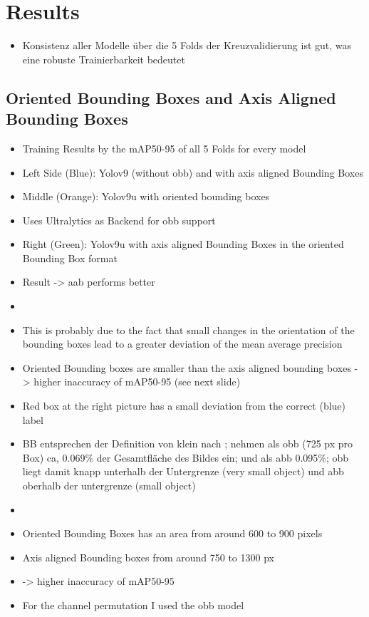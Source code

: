 \chapter{Results}
\label{ch:results}

\begin{itemize}
    \item Konsistenz aller Modelle über die 5 Folds der Kreuzvalidierung ist gut, was eine robuste Trainierbarkeit bedeutet
\end{itemize}
\section{Oriented Bounding Boxes and Axis Aligned Bounding Boxes}
\begin{itemize}
    \item Training Results by the mAP50-95 of all 5 Folds for every model 
    \item Left Side (Blue): Yolov9 (without obb) and with axis aligned Bounding Boxes
    \item Middle (Orange): Yolov9u with oriented bounding boxes
    \item Uses Ultralytics as Backend for obb support
    \item Right (Green): Yolov9u with axis aligned Bounding Boxes in the oriented Bounding Box format
    \item Result -> aab performs better
    \item {}
    \item This is probably due to the fact that small changes in the orientation of the bounding boxes lead to a greater deviation of the mean average precision 
    \item Oriented Bounding boxes are smaller than the axis aligned bounding boxes -> higher inaccuracy of mAP50-95 (see next slide)
    \item Red box at the right picture has a small deviation from the correct (blue) label
    \item BB entsprechen der Definition von klein nach \cite{Chen2017}; nehmen als obb (725 px pro Box) ca, 0.069\% der Gesamtfläche des Bildes ein; und als abb 0.095\%; obb liegt damit knapp unterhalb der Untergrenze (very small object) und abb oberhalb der untergrenze (small object)
\end{itemize}
\begin{itemize}
    \item {}
    \item Oriented Bounding Boxes has an area from around 600 to 900 pixels 
    \item Axis aligned Bounding boxes from around 750 to 1300 px
    \item-> higher inaccuracy of mAP50-95

    \item For the channel permutation I used the obb model

\end{itemize}

